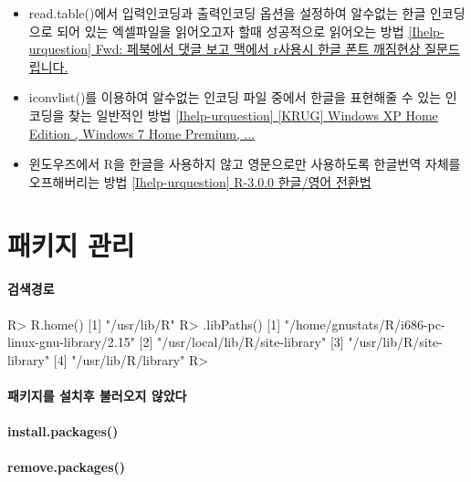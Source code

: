 \begin{itemize}
\item read.table()에서 입력인코딩과 출력인코딩 옵션을 설정하여 알수없는 한글 인코딩으로 되어 있는 엑셀파일을 읽어오고자 할때 성공적으로 읽어오는 방법   \href{http://lists.r-forge.r-project.org/pipermail/ihelp-urquestion/2013-April/000016.html}{[Ihelp-urquestion] Fwd: 페북에서 댓글 보고 맥에서 r사용시 한글 폰트 깨짐현상 질문드립니다.}
\item iconvlist()를 이용하여 알수없는 인코딩 파일 중에서 한글을 표현해줄 수 있는 인코딩을 찾는 일반적인 방법  \href{http://lists.r-forge.r-project.org/pipermail/ihelp-urquestion/2013-April/000017.html}{[Ihelp-urquestion] [KRUG] Windows XP Home Edition , Windows 7 Home Premium, ...}
\item 윈도우즈에서 R을 한글을 사용하지 않고 영문으로만 사용하도록 한글번역 자체를 오프해버리는 방법  \href{http://lists.r-forge.r-project.org/pipermail/ihelp-urquestion/2013-April/000003.html}{[Ihelp-urquestion] R-3.0.0 한글/영어 전환법}
\end{itemize}

\section{패키지 관리}
\paragraph{검색경로} 

\begin{Schunk}
\begin{Soutput}
R> R.home()
[1] "/usr/lib/R"
R> .libPaths()
[1] "/home/gnustats/R/i686-pc-linux-gnu-library/2.15"
[2] "/usr/local/lib/R/site-library"                  
[3] "/usr/lib/R/site-library"                        
[4] "/usr/lib/R/library"                             
R> 
\end{Soutput}
\end{Schunk}
\paragraph{패키지를 설치후 불러오지 않았다}
\paragraph{install.packages()}
\paragraph{remove.packages()}
